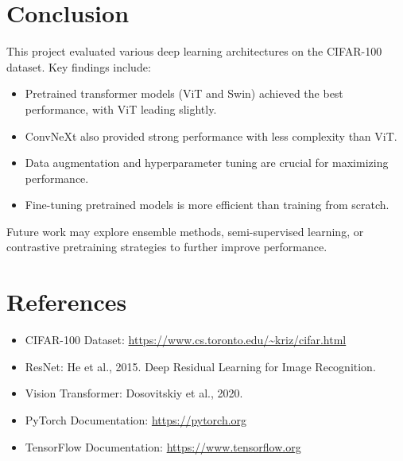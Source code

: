 \documentclass[11pt]{article}
\begin{document}
\section{Conclusion}

This project evaluated various deep learning architectures on the CIFAR-100 dataset. Key findings include:
\begin{itemize}
    \item Pretrained transformer models (ViT and Swin) achieved the best performance, with ViT leading slightly.
    \item ConvNeXt also provided strong performance with less complexity than ViT.
    \item Data augmentation and hyperparameter tuning are crucial for maximizing performance.
    \item Fine-tuning pretrained models is more efficient than training from scratch.
\end{itemize}

Future work may explore ensemble methods, semi-supervised learning, or contrastive pretraining strategies to further improve performance.

\section*{References}

\begin{itemize}
    \item CIFAR-100 Dataset: \url{https://www.cs.toronto.edu/~kriz/cifar.html}
    \item ResNet: He et al., 2015. Deep Residual Learning for Image Recognition.
    \item Vision Transformer: Dosovitskiy et al., 2020.
    \item PyTorch Documentation: \url{https://pytorch.org}
    \item TensorFlow Documentation: \url{https://www.tensorflow.org}
\end{itemize}
\end{document}
